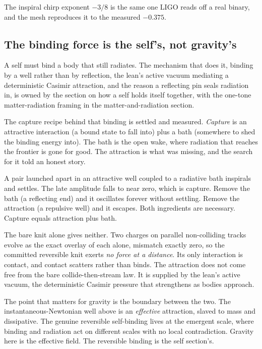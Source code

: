 The inspiral chirp exponent $-3/8$ is the same one LIGO reads off a real binary, and the mesh reproduces it to the measured $-0.375$.

\subsection{The binding force is the self's, not gravity's}

A self must bind a body that still radiates. The mechanism that does it, binding by a well rather than by reflection, the lean's active vacuum mediating a deterministic Casimir attraction, and the reason a reflecting pin seals radiation in, is owned by the section on how a self holds itself together, with the one-tone matter-radiation framing in the matter-and-radiation section.

The capture recipe behind that binding is settled and measured. \emph{Capture} is an attractive interaction (a bound state to fall into) plus a bath (somewhere to shed the binding energy into). The bath is the open wake, where radiation that reaches the frontier is gone for good. The attraction is what was missing, and the search for it told an honest story.

\begin{result}
A pair launched apart in an attractive well coupled to a radiative bath inspirals and settles. The late amplitude falls to near zero, which is capture. Remove the bath (a reflecting end) and it oscillates forever without settling. Remove the attraction (a repulsive well) and it escapes. Both ingredients are necessary. Capture equals attraction plus bath.
\end{result}

The bare knit alone gives neither. Two charges on parallel non-colliding tracks evolve as the exact overlay of each alone, mismatch exactly zero, so the committed reversible knit exerts \emph{no force at a distance}. Its only interaction is contact, and contact scatters rather than binds. The attraction does not come free from the bare collide-then-stream law. It is supplied by the lean's active vacuum, the deterministic Casimir pressure that strengthens as bodies approach.

The point that matters for gravity is the boundary between the two. The instantaneous-Newtonian well above is an \emph{effective} attraction, slaved to mass and dissipative. The genuine reversible self-binding lives at the emergent scale, where binding and radiation act on different scales with no local contradiction. Gravity here is the effective field. The reversible binding is the self section's.

